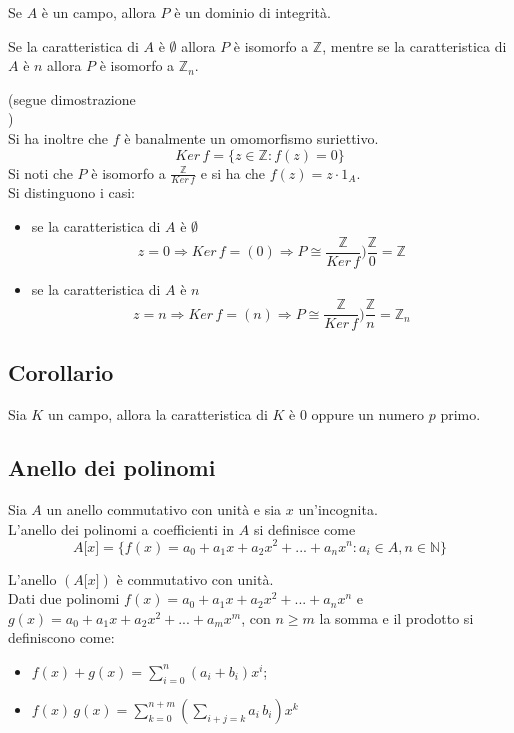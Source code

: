 \begin{flushleft}
\begin{proprieta}
Se $A$ è un campo, allora $P$ è un dominio di integrità.
\end{proprieta}

\begin{proprieta}
Se la caratteristica di $A$ è $\emptyset$ allora $P$ è isomorfo a $\mathbb{Z}$, mentre se la caratteristica di $A$ è $n$ allora $P$ è isomorfo a $\mathbb{Z}_n$.
\end{proprieta}
(segue dimostrazione \\ \vspace{300px})\\
Si ha inoltre che $f$ è banalmente un omomorfismo suriettivo.\\
\[Ker\,f = \{z\in \mathbb{Z}: f(z) = 0\}\]
Si noti che $P$ è isomorfo a $\frac{\mathbb{Z}}{Ker\,f}$ e si ha che $f(z) = z\cdot 1_A$.\\
Si distinguono i casi:
\begin{itemize}
    \item se la caratteristica di $A$ è $\emptyset$
    \[z = 0 \Rightarrow Ker\,f = (0) \Rightarrow P \cong \frac{\mathbb{Z}}{Ker\,f} ) \frac{\mathbb{Z}}{0} = \mathbb{Z}\]
    \item se la caratteristica di $A$ è $n$
    \[z = n \Rightarrow Ker\,f = (n) \Rightarrow P \cong \frac{\mathbb{Z}}{Ker\,f} ) \frac{\mathbb{Z}}{n} = \mathbb{Z}_n\]
\end{itemize}

\subsection{Corollario}
Sia $K$ un campo, allora la caratteristica di $K$ è 0 oppure un numero $p$ primo.

\subsection{Anello dei polinomi}
Sia $A$ un anello commutativo con unità e sia $x$ un'incognita.\\
L'anello dei polinomi a coefficienti in $A$ si definisce come
\[A\big[x\big] = \{f(x) = a_0 + a_1 x+a_2 x^2+...+a_n x^n:a_i \in A, n\in \mathbb{N}\}\]

L'anello $(A\big[x\big])$ è commutativo con unità.\\
Dati due polinomi $f(x) = a_0 + a_1 x+a_2 x^2+...+a_n x^n$ e $g(x) = a_0 + a_1 x+a_2 x^2+...+a_m x^m$, con $n\geq m$ la somma e il prodotto si definiscono come:
\begin{itemize}
    \item $f(x) + g(x) = \sum_{i=0}^n (a_i + b_i)x^i$;
    \item $f(x)\,g(x) = \sum_{k=0}^{n+m} (\sum_{i+j=k}a_i\,b_i)x^k$
\end{itemize}




\end{flushleft}
